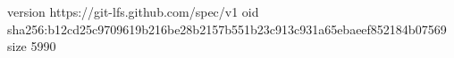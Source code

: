 version https://git-lfs.github.com/spec/v1
oid sha256:b12cd25c9709619b216be28b2157b551b23c913c931a65ebaeef852184b07569
size 5990
